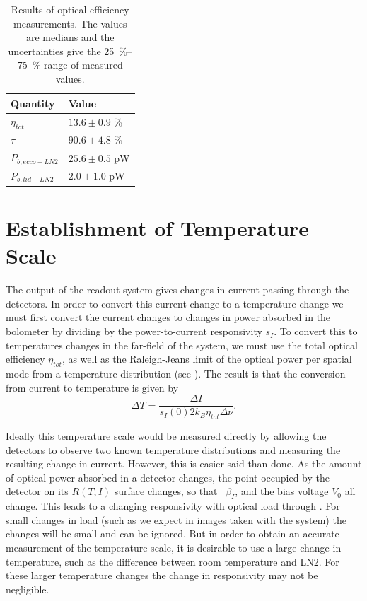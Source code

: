 \begin{table}[t]
\centering
\caption{
Results of optical efficiency measurements.
The values are medians and the uncertainties give the \SIrange{25}{75}{\percent} range of measured values.
}
\label{tab:opt-eff}
\begin{tabular}{l l}
\toprule
Quantity &  Value \\
\midrule
$\eta_{tot}$ & $13.6 \pm  0.9$ \% \\ 
$\tau$ & $90.6 \pm  4.8$ \% \\ 
$P_{b,ecco-LN2}$   & $25.6 \pm  0.5$ pW \\ 
$P_{b,lid-LN2}$ & $ 2.0 \pm  1.0$ pW \\
\bottomrule
\end{tabular}
\end{table}
 
\section{Establishment of Temperature Scale} \label{sec:ch8-temp-scale}

The output of the readout system gives changes in current passing through the detectors.
In order to convert this current change to a temperature change we must first convert the current changes to changes in power absorbed in the bolometer by dividing by the power-to-current responsivity $s_I$.
To convert this to temperatures changes in the far-field of the system, we must use the total optical efficiency $\eta_{tot}$, as well as the Raleigh-Jeans limit of the optical power per spatial mode from a temperature distribution (see ).
The result is that the conversion from current to temperature is given by
\begin{equation} \label{eqn:ch8-I-to-T}
  \Delta T = \frac{\Delta I}{s_I(0) 2 k_B \eta_{tot} \Delta \nu}.
\end{equation}

Ideally this temperature scale would be measured directly by allowing the detectors to observe two known temperature distributions and measuring the resulting change in current.
However, this is easier said than done.
As the amount of optical power absorbed in a detector changes, the point occupied by the detector on its $R(T,I)$ surface changes, so that \Loop\, $\beta_I$, and the bias voltage $V_0$ all change.
This leads to a changing responsivity with optical load through .
For small changes in load (such as we expect in images taken with the system) the changes will be small and can be ignored.
But in order to obtain an accurate measurement of the temperature scale, it is desirable to use a large change in temperature, such as the difference between room temperature and LN2.
For these larger temperature changes the change in responsivity may not be negligible. 

